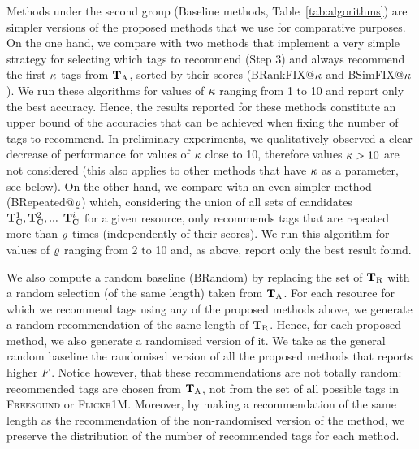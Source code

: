 Methods under the second group (Baseline methods, Table~\ref{tab:algorithms}) are simpler versions of the proposed methods that we use for comparative purposes. 
On the one hand, we compare with two methods that implement a very simple strategy for selecting which tags to recommend (Step 3) and always recommend the first $\kappa$ tags from $\mathbf{T}_{\text{A}}$, sorted by their scores (BRankFIX@$\kappa$ and BSimFIX@$\kappa$). We run these algorithms for values of $\kappa$ ranging from 1 to 10 and report only the best accuracy. 
Hence, the results reported for these methods constitute an upper bound of the accuracies that can be achieved when fixing the number of tags to recommend.
In preliminary experiments, we qualitatively observed a clear decrease of performance for values of $\kappa$ close to 10, therefore values $\kappa > 10$ are not considered (this also applies to other methods that have $\kappa$ as a parameter, see below).
On the other hand, we compare with an even simpler method (BRepeated@$\varrho$) which, considering the union of all sets of candidates ${\mathbf{T}_{\text{C}}^1}, {\mathbf{T}_{\text{C}}^2}, \text{... } \mathbf{T}_{\text{C}}^i$ for a given resource, only recommends tags that are repeated more than $\varrho$ times (independently of their scores). We run this algorithm for values of $\varrho$ ranging from 2 to 10 and, as above, report only the best result found. 

We also compute a random baseline (BRandom) by replacing the set of $\mathbf{T}_{\text{R}}$ with a random selection (of the same length) taken from $\mathbf{T}_{\text{A}}$. For each resource for which we recommend tags using any of the proposed methods above, we generate a random recommendation of the same length of $\mathbf{T}_{\text{R}}$. Hence, for each proposed method, we also generate a randomised version of it. We take as the general random baseline the randomised version of all the proposed methods that reports higher $F$.
Notice however, that these recommendations are not totally random: recommended tags are chosen from $\mathbf{T}_{\text{A}}$, not from the set of all possible tags in \textsc{Freesound} or \textsc{Flickr1M}. Moreover, by making a recommendation of the same length as the recommendation of the non-randomised version of the method, we preserve the distribution of the number of recommended tags for each method.

